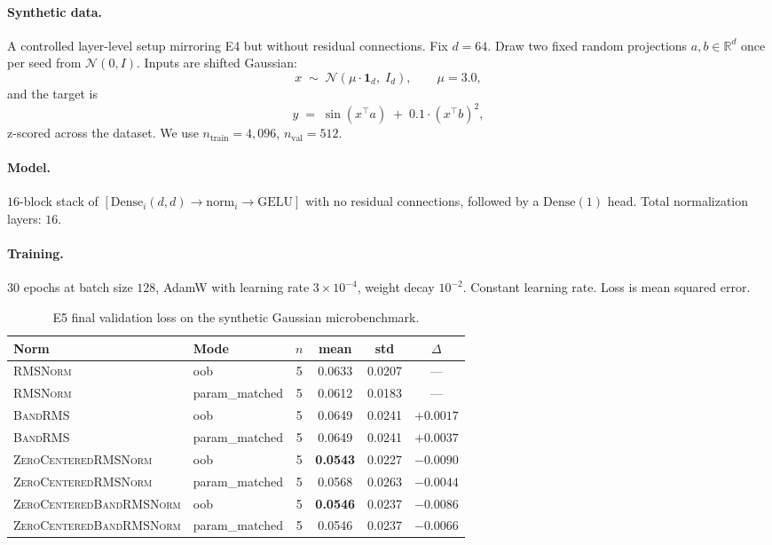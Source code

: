 \documentclass{article}
\newcommand{\R}{\mathbb{R}}
\newcommand{\rms}{\textsc{RMSNorm}}
\newcommand{\bandrms}{\textsc{BandRMS}}
\newcommand{\zcrms}{\textsc{ZeroCentered}\-\textsc{RMSNorm}}
\newcommand{\zcband}{\textsc{ZeroCentered}\-\textsc{BandRMSNorm}}
\begin{document}
\paragraph{Synthetic data.}
A controlled layer-level setup mirroring E4 but without residual connections.
Fix $d{=}64$.
Draw two fixed random projections $a, b \in \R^d$ once per seed from $\mathcal{N}(0, I)$.
Inputs are shifted Gaussian:
$$x \;\sim\; \mathcal{N}(\mu \cdot \mathbf{1}_d,\; I_d), \qquad \mu = 3.0,$$
and the target is
$$y \;=\; \sin(x^\top a) \;+\; 0.1 \cdot (x^\top b)^2,$$
z-scored across the dataset.
We use $n_{\text{train}} = 4{,}096$, $n_{\text{val}} = 512$.

\paragraph{Model.}
$16$-block stack of $[\text{Dense}_i(d, d) \to \text{norm}_i \to \text{GELU}]$ with no residual connections, followed by a $\text{Dense}(1)$ head.
Total normalization layers: $16$.

\paragraph{Training.}
$30$ epochs at batch size $128$, AdamW with learning rate $3 \times 10^{-4}$, weight decay $10^{-2}$. Constant learning rate. Loss is mean squared error.

\begin{table}[H]
\centering
\caption{E5 final validation loss on the synthetic Gaussian microbenchmark.}
\label{tab:e5}
\renewcommand{\arraystretch}{1.15}
\begin{tabular}{llcccc}
\toprule
\textbf{Norm} & \textbf{Mode} & \textbf{$n$} & \textbf{mean} & \textbf{std} & \textbf{$\Delta$} \\
\midrule
\rms{}            & oob            & 5 & 0.0633 & 0.0207 & --- \\
\rms{}            & param\_matched & 5 & 0.0612 & 0.0183 & --- \\
\bandrms{}        & oob            & 5 & 0.0649 & 0.0241 & $+0.0017$ \\
\bandrms{}        & param\_matched & 5 & 0.0649 & 0.0241 & $+0.0037$ \\
\zcrms{}          & oob            & 5 & \textbf{0.0543} & 0.0227 & $-0.0090$ \\
\zcrms{}          & param\_matched & 5 & 0.0568 & 0.0263 & $-0.0044$ \\
\zcband{}         & oob            & 5 & \textbf{0.0546} & 0.0237 & $-0.0086$ \\
\zcband{}         & param\_matched & 5 & 0.0546 & 0.0237 & $-0.0066$ \\
\bottomrule
\end{tabular}
\end{table}
\end{document}
